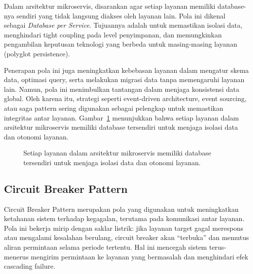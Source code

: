 Dalam arsitektur mikroservis, disarankan agar setiap layanan memiliki database-nya sendiri yang tidak langsung diakses oleh layanan lain. Pola ini dikenal sebagai \textit{Database per Service}. Tujuannya adalah untuk memastikan isolasi data, menghindari tight coupling pada level penyimpanan, dan memungkinkan pengambilan keputusan teknologi yang berbeda untuk masing-masing layanan (polyglot persistence).

Penerapan pola ini juga meningkatkan kebebasan layanan dalam mengatur skema data, optimasi query, serta melakukan migrasi data tanpa memengaruhi layanan lain. Namun, pola ini menimbulkan tantangan dalam menjaga konsistensi data global. Oleh karena itu, strategi seperti event-driven architecture, event sourcing, atau saga pattern sering digunakan sebagai pelengkap untuk memastikan integritas antar layanan. Gambar~\ref{fig:database-per-service} menunjukkan bahwa setiap layanan dalam arsitektur mikroservis memiliki database tersendiri untuk menjaga isolasi data dan otonomi layanan.

\begin{figure}[h]
	\centering
	\caption{Setiap layanan dalam arsitektur mikroservis memiliki database tersendiri untuk menjaga isolasi data dan otonomi layanan.}
	\vspace{0.5em}
	\label{fig:database-per-service}
\end{figure}


\subsection{Circuit Breaker Pattern}

Circuit Breaker Pattern merupakan pola yang digunakan untuk meningkatkan ketahanan sistem terhadap kegagalan, terutama pada komunikasi antar layanan. Pola ini bekerja mirip dengan saklar listrik: jika layanan target gagal merespons atau mengalami kesalahan berulang, circuit breaker akan “terbuka” dan memutus aliran permintaan selama periode tertentu. Hal ini mencegah sistem terus-menerus mengirim permintaan ke layanan yang bermasalah dan menghindari efek cascading failure.

